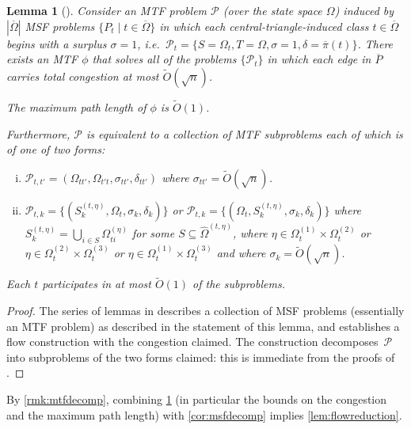 \documentclass[a4paper, 12p]{article}
\numberwithin{equation}{section}
\newcommand{\Omproj}{\overline{\Omega}}
\newcommand{\piproj}{\overline{\pi}}
\newcommand{\Pproj}{\overline{P}}
\newcommand{\Omorproj}{\hat{\Omega}}
\newtheorem{lemma}[theorem]{Lemma}
\begin{document}
\begin{lemma}[\cite{eppstein2022improvedfull}]
\label{lem:efmtffull}
Consider an MTF problem $\mathcal{P}$ (over the state space $\Omega$) induced by $|\Omproj|$ MSF problems $\{P_t \mid t \in \Omproj\}$ in which each central-triangle-induced class $t \in \Omproj$ begins with a surplus $\sigma = 1$, i.e.~$\mathcal{P}_t = \{S = \Omega_t, T = \Omega, \sigma = 1, \delta = \piproj(t)\}$. There exists an MTF $\phi$ that solves all of the problems $\{\mathcal{P}_t\}$ in which each edge in $\Pproj$ carries total congestion at most $\widetilde O(\sqrt n)$.

The maximum path length of $\phi$ is $\widetilde O(1)$.

Furthermore, $\mathcal{P}$ is equivalent to a collection of MTF subproblems each of which is of one of two forms:
\begin{enumerate}[(i)]
\item \label{case:across} $\mathcal{P}_{t,t'} = (\Omega_{tt'}, \Omega_{t't}, \sigma_{tt'}, \delta_{tt'})$ where $\sigma_{tt'} = \widetilde O(\sqrt n)$.
\item \label{case:internal} $\mathcal{P}_{t,k} = \{(S_k^{(t, \eta)}, \Omega_t, \sigma_k, \delta_k)\}$ or $\mathcal{P}_{t,k} = \{(\Omega_t, S_k^{(t,\eta)}, \sigma_k, \delta_k)\}$ where $S_k^{(t, \eta)} = \bigcup_{i \in S} \Omega_{ti}^{(\eta)}$ for some $S \subseteq \Omorproj^{(t,\eta)}$, where $\eta \in \Omega_t^{(1)} \times \Omega_t^{(2)}$ or $\eta \in \Omega_t^{(2)} \times \Omega_t^{(3)}$ or $\eta \in \Omega_t^{(1)} \times \Omega_t^{(3)}$ and where $\sigma_k = \widetilde O(\sqrt n)$. 
\end{enumerate}
Each $t$ participates in at most $\widetilde O(1)$ of the subproblems.
\end{lemma}
\begin{proof}
    The series of lemmas in \cite[Appendix B]{eppstein2022improvedfull} describes a collection of MSF problems (essentially an MTF problem) as described in the statement of this lemma, and establishes a flow construction with the congestion claimed. The construction decomposes~$\mathcal{P}$ into subproblems of the two forms claimed: this is immediate from the proofs of \cite[Lemma 32, Lemma 38, Corollary 39, Lemma 40, and Lemma 41]{eppstein2022improvedfull}.
\end{proof}

By \cref{rmk:mtfdecomp}, combining \cref{lem:efmtffull} (in particular the bounds on the congestion and the maximum path length) with \cref{cor:msfdecomp} implies \cref{lem:flowreduction}.
\end{document}
